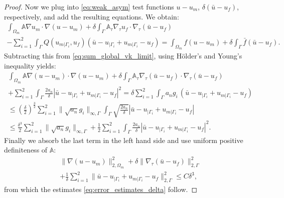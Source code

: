 \documentclass[a4paper]{article}
\def\tn#1{{\mathbb{#1}}}    %
\def\norm#1{\|#1\|}
\begin{document}
\begin{proof}
Now we plug into \eqref{eq:weak_asym} test functions $u-u_m$, $\delta(\bar u-u_f)$, respectively, and add the resulting equations.
We obtain:
\begin{multline*}
\int_{\Omega_m}\tn A\nabla u_m\cdot\nabla(u-u_m) + \delta\int_\Gamma\tn A_\tau\nabla_\tau u_f\cdot\nabla_\tau(\bar u-u_f)\\
- \sum_{i=1}^2\int_\Gamma Q(u_{m|\Gamma_i},u_f)(\bar u - u_{|\Gamma_i}+u_{m|\Gamma_i} - u_f)
= \int_{\Omega_m} f(u-u_m)
+ \delta\int_\Gamma\bar f(\bar u-u_f).
\end{multline*}
Subtracting this from \eqref{eq:sum_global_vk_limit}, using H\"older's and Young's inequality yields:
\begin{multline}
\int_{\Omega_m}\tn A\nabla (u-u_m)\cdot\nabla(u-u_m)
+\delta\int_\Gamma\tn A_\tau\nabla_\tau(\bar u-u_f)\cdot\nabla_\tau(\bar u-u_f)\\
+ \sum_{i=1}^2\int_\Gamma \frac{2a_n}\delta |\bar u - u_{|\Gamma_i} + u_{m|\Gamma_i} - u_f|^2
= \delta\sum_{i=1}^2\int_\Gamma a_n g_i\, (\bar u - u_{|\Gamma_i} + u_{m|\Gamma_i} - u_f)\\
\le \left(\frac\delta2\right)^{\frac32}\sum_{i=1}^2\norm{\sqrt{a_n}g_i}_{\infty,\Gamma}\int_\Gamma\sqrt{\frac{2a_n}\delta}|\bar u - u_{|\Gamma_i} + u_{m|\Gamma_i} - u_f|\\
\le \frac{\delta^3}2\sum_{i=1}^2\norm{\sqrt{a_n}g_i}_{\infty,\Gamma} + \frac12\sum_{i=1}^2\int_\Gamma \frac{2a_n}\delta |\bar u - u_{|\Gamma_i} + u_{m|\Gamma_i} - u_f|^2.
\end{multline}
Finally we absorb the last term in the left hand side and use uniform positive definiteness of $\tn A$:
\begin{multline}
\norm{\nabla (u-u_m)}_{2,\Omega_m}^2
+\delta\norm{\nabla_\tau(\bar u-u_f)}_{2,\Gamma}^2\\
+ \frac1\delta\sum_{i=1}^2\norm{\bar u - u_{|\Gamma_i} + u_{m|\Gamma_i} - u_f}_{2,\Gamma}^2
\le C\delta^3,
\end{multline}
from which the estimates \eqref{eq:error_estimates_delta} follow.
\end{proof}
\end{document}
